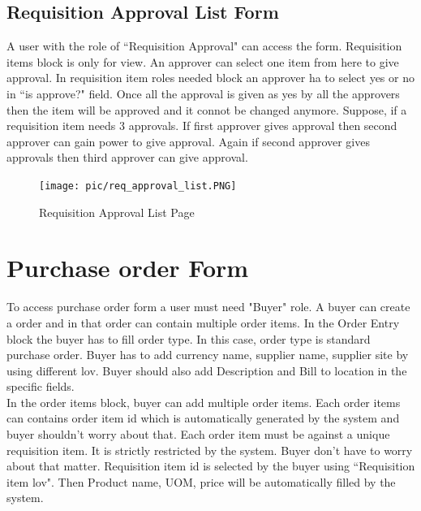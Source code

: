 \documentclass[12pt]{report} %
\begin{document}
\begin{landscape}
\section{Requisition Approval List Form}
A user with the role of ``Requisition Approval" can access the form. Requisition items block is only for view. An approver can select one item from here to give approval. In requisition item roles needed block an approver ha to select yes or no in ``is approve?" field. Once all the approval is given as yes by all the approvers then the item will be approved and it connot be changed anymore.
Suppose, if a requisition item needs 3 approvals. If first approver gives approval then second approver can gain power to give approval. Again if second approver gives approvals then third approver can give approval. 
\begin{figure}[h]
	\begin{center}
		\texttt{[image: pic/req\_approval\_list.PNG]}
	\end{center}
	\caption{Requisition Approval List Page}
	\label{fig:req_approval_list}
\end{figure}
\thispagestyle{empty} 
\end{landscape}
\clearpage
\restoregeometry






\section{Purchase order Form}
To access purchase order form a user must need "Buyer" role. A buyer can create a order and in that order can contain multiple order items. In the Order Entry block the buyer has to fill order type. In this case, order type is standard purchase order. Buyer has to add currency name, supplier name, supplier site by using different lov. Buyer should also add Description and Bill to location in the specific fields. \\

In the order items block, buyer can add multiple order items. Each order items can contains order item id which is automatically generated by the system and buyer shouldn't worry about that. Each order item must be against a unique requisition item. It is strictly restricted by the system. Buyer don't have to worry about that matter. Requisition item id is selected by the buyer using ``Requisition item lov". Then Product name, UOM, price will be automatically filled by the system.\\
\end{document}
